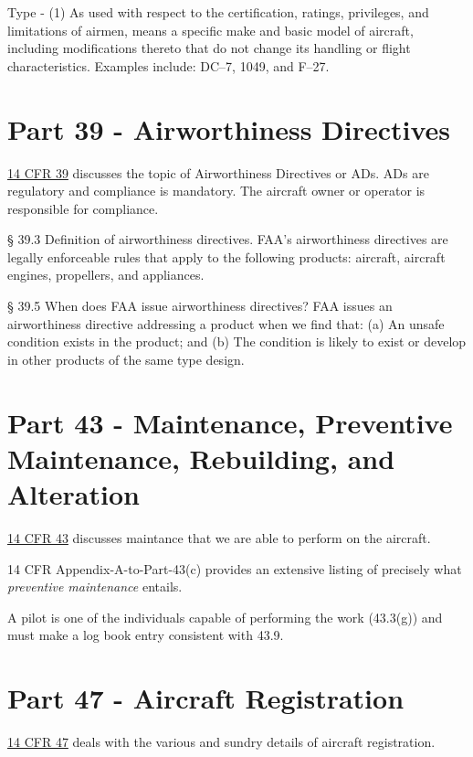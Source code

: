 Type - (1) As used with respect to the certification, ratings, privileges, and limitations of airmen, means a specific make and basic model of aircraft, including modifications thereto that do not change its handling or flight characteristics. Examples include: DC–7, 1049, and F–27. 

\section{Part 39 - Airworthiness Directives}

\href{https://www.ecfr.gov/current/title-14/chapter-I/subchapter-C/part-39}{14 CFR 39} discusses the topic of Airworthiness Directives or ADs. ADs are regulatory and compliance is mandatory. The aircraft owner or operator is responsible for compliance.

§ 39.3 Definition of airworthiness directives. FAA's airworthiness directives are legally enforceable rules that apply to the following products: aircraft, aircraft engines, propellers, and appliances.

§ 39.5 When does FAA issue airworthiness directives? FAA issues an airworthiness directive addressing a product when we find that: (a) An unsafe condition exists in the product; and (b) The condition is likely to exist or develop in other products of the same type design.

\section{Part 43 - Maintenance, Preventive Maintenance, Rebuilding, and Alteration}

\href{https://www.ecfr.gov/current/title-14/chapter-I/subchapter-C/part-43}{14 CFR 43} discusses maintance that we are able to perform on the aircraft.

14 CFR Appendix-A-to-Part-43(c) provides an extensive listing of precisely what \emph{preventive maintenance} entails.

A pilot is one of the individuals capable of performing the work (43.3(g)) and must make a log book entry consistent with 43.9.

\section{Part 47 - Aircraft Registration}

\href{https://www.ecfr.gov/on/2017-01-03/title-14/chapter-I/subchapter-C/part-47}{14 CFR 47} deals with the various and sundry details of aircraft registration.

